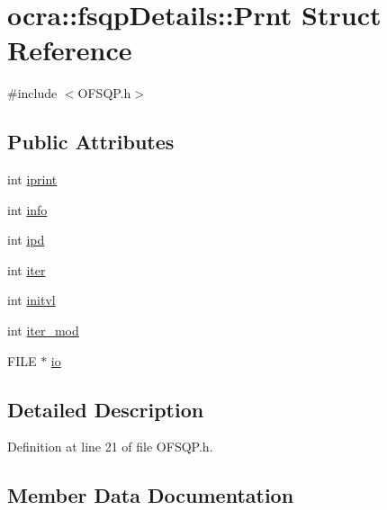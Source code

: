 \hypertarget{structocra_1_1fsqpDetails_1_1Prnt}{}\section{ocra\+:\+:fsqp\+Details\+:\+:Prnt Struct Reference}
\label{structocra_1_1fsqpDetails_1_1Prnt}


{\ttfamily \#include $<$O\+F\+S\+Q\+P.\+h$>$}

\subsection*{Public Attributes}
\begin{DoxyCompactItemize}
\item 
int \hyperlink{structocra_1_1fsqpDetails_1_1Prnt_a6ae9ecd70d6b52123a4d24a8cc47dfa6}{iprint}
\item 
int \hyperlink{structocra_1_1fsqpDetails_1_1Prnt_a536e9b866d88796ae9520f1afbab3bdb}{info}
\item 
int \hyperlink{structocra_1_1fsqpDetails_1_1Prnt_a00e8213f2ec3c624907394b01ef7c171}{ipd}
\item 
int \hyperlink{structocra_1_1fsqpDetails_1_1Prnt_a276fb8038114797a04a94e1b2ec10a35}{iter}
\item 
int \hyperlink{structocra_1_1fsqpDetails_1_1Prnt_a040dc7b88b4f54f32fd662b40af9e1f4}{initvl}
\item 
int \hyperlink{structocra_1_1fsqpDetails_1_1Prnt_ab7a06548e1ccc8483b3221798ab15e7e}{iter\+\_\+mod}
\item 
F\+I\+LE $\ast$ \hyperlink{structocra_1_1fsqpDetails_1_1Prnt_a558896e07301f884eac55e411c6bfbd1}{io}
\end{DoxyCompactItemize}


\subsection{Detailed Description}


Definition at line 21 of file O\+F\+S\+Q\+P.\+h.



\subsection{Member Data Documentation}
\hypertarget{structocra_1_1fsqpDetails_1_1Prnt_a536e9b866d88796ae9520f1afbab3bdb}{}\label{structocra_1_1fsqpDetails_1_1Prnt_a536e9b866d88796ae9520f1afbab3bdb} 
